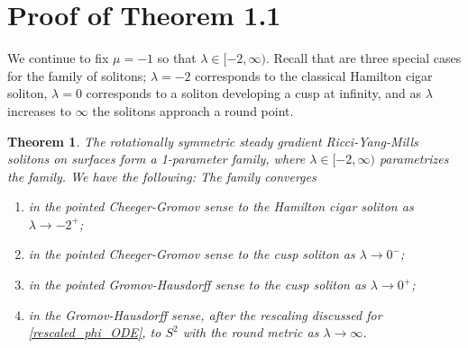 \documentclass[12pt, a4paper, reqno, oneside]{amsart}
\numberwithin{equation}{section}
\theoremstyle{plain}
\newtheorem{theorem}{Theorem}[section]
\theoremstyle{definition}
\theoremstyle{plain}
\begin{document}
\section{Proof of Theorem 1.1}
We continue to fix $\mu=-1$ so that $\lambda\in[-2,\infty)$. Recall that are three special cases for the family of solitons; $\lambda = -2$ corresponds to the classical Hamilton cigar soliton, $\lambda = 0$ corresponds to a soliton developing a cusp at infinity, and as $\lambda$ increases to $\infty$ the solitons approach a round point.

\begin{theorem}\label{convergencethm}
The rotationally symmetric steady gradient Ricci-Yang-Mills solitons on surfaces form a 1-parameter family, where $\lambda\in [-2,\infty)$ parametrizes the family. We have the following: The family converges
  \begin{enumerate}[label=(\arabic*)]
    \item in the pointed Cheeger-Gromov sense to the Hamilton cigar soliton as $\lambda\to -2^{+}$;
    \item in the pointed Cheeger-Gromov sense to the cusp soliton as $\lambda\to 0^{-}$;
    \item in the pointed Gromov-Hausdorff sense to the cusp soliton as $\lambda\to 0^{+}$;
    \item in the Gromov-Hausdorff sense, after the rescaling discussed for \eqref{rescaled_phi_ODE}, to $S^{2}$ with the round metric as $\lambda\to \infty$.
  \end{enumerate}
\end{theorem}
\end{document}
